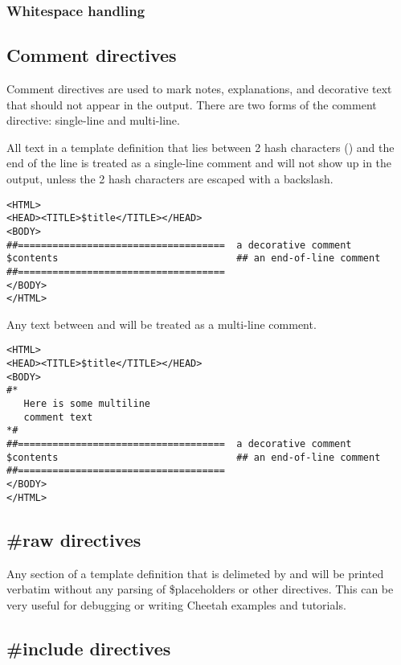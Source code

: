\begin{enumerate}
\subsubsection{Whitespace handling}


\subsection{Comment directives}

Comment directives are used to mark notes, explanations, and decorative text
that should not appear in the output.  There are two forms of the comment
directive: single-line and multi-line.

All text in a template definition that lies between 2 hash characters
(\code{\#\#}) and the end of the line is treated as a single-line comment and
will not show up in the output, unless the 2 hash characters are escaped with a
backslash.
\begin{verbatim}
<HTML>
<HEAD><TITLE>$title</TITLE></HEAD>
<BODY>
##====================================  a decorative comment
$contents                               ## an end-of-line comment
##====================================
</BODY>
</HTML>
\end{verbatim}

Any text between \code{\#*} and \code{*\#} will be treated as a multi-line
comment.
\begin{verbatim}
<HTML>
<HEAD><TITLE>$title</TITLE></HEAD>
<BODY>
#*
   Here is some multiline
   comment text
*#
##====================================  a decorative comment
$contents                               ## an end-of-line comment
##====================================
</BODY>
</HTML>
\end{verbatim}

\subsection{\#raw directives}
Any section of a template definition that is delimeted by  and
 will be printed verbatim without any parsing of
\$placeholders or other directives.  This can be very useful for debugging or
writing Cheetah examples and tutorials.

\subsection{\#include directives}


\end{enumerate}
